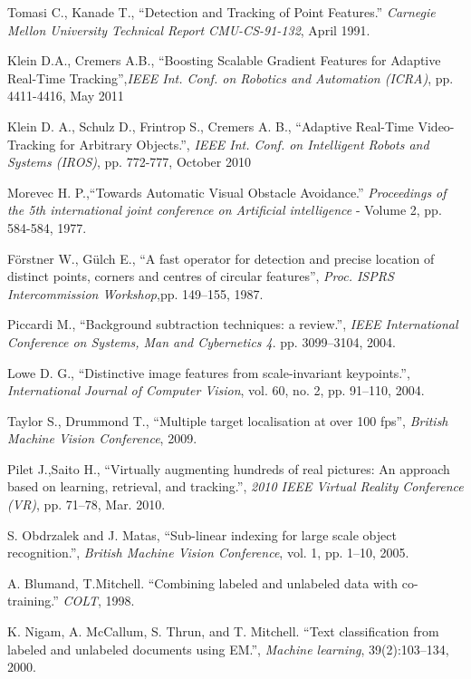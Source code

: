 \begin{thebibliography}{SMAT}
 Tomasi C., Kanade T., ``Detection and Tracking of Point Features.'' \textit{Carnegie Mellon University Technical Report CMU-CS-91-132}, April 1991.

 Klein D.A., Cremers A.B., ``Boosting Scalable Gradient Features for Adaptive Real-Time Tracking'',\textit{IEEE Int. Conf. on Robotics and Automation (ICRA)}, pp. 4411-4416, May 2011

 Klein D. A., Schulz D., Frintrop S., Cremers A. B., ``Adaptive Real-Time Video-Tracking for Arbitrary Objects.'', \textit{IEEE Int. Conf. on Intelligent Robots and Systems (IROS)}, pp. 772-777, October 2010

 Morevec H. P.,``Towards Automatic Visual Obstacle Avoidance.'' \textit{Proceedings of the 5th international joint conference on Artificial intelligence} - Volume 2, pp. 584-584, 1977.

 Förstner W., Gülch E., ``A fast operator for detection and precise location of distinct points, corners and centres of circular features'', \textit{Proc. ISPRS Intercommission Workshop},pp. 149–155, 1987.

 Piccardi M., ``Background subtraction techniques: a review.'', \textit{IEEE International Conference on Systems, Man and Cybernetics 4}. pp. 3099–3104, 2004.

 Lowe D. G., ``Distinctive image features from scale-invariant keypoints.'', \textit{International Journal of Computer Vision}, vol. 60, no. 2, pp. 91–110, 2004.

 Taylor S., Drummond T., ``Multiple target localisation at over 100 fps'', \textit{British Machine Vision Conference}, 2009.

 Pilet J.,Saito H., ``Virtually augmenting hundreds of real pictures: An approach based on learning, retrieval, and tracking.'', \textit{2010 IEEE Virtual Reality Conference (VR)}, pp. 71–78, Mar. 2010.

 S. Obdrzalek and J. Matas, ``Sub-linear indexing for large scale object recognition.'', \textit{British Machine Vision Conference}, vol. 1, pp. 1–10, 2005.

 A. Blumand, T.Mitchell. ``Combining labeled and unlabeled data with co-training.'' \textit{COLT}, 1998.

 K. Nigam, A. McCallum, S. Thrun, and T. Mitchell. ``Text classification from labeled and unlabeled documents using EM.'', \textit{Machine learning}, 39(2):103–134, 2000.


\end{thebibliography}
